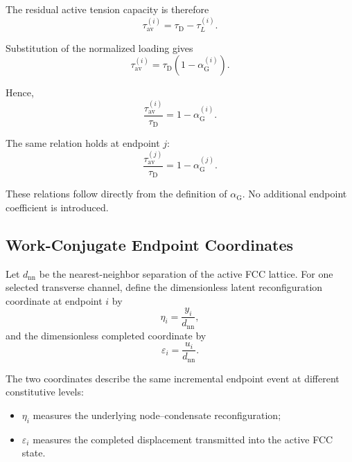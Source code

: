 The residual active tension capacity is therefore
\begin{equation}
    \tau_{\mathrm{av}}^{(i)} = \tau_{\mathrm{D}} - \tau_L^{(i)}.
\end{equation}

Substitution of the normalized loading gives
\begin{equation}
    \tau_{\mathrm{av}}^{(i)} = \tau_{\mathrm{D}} \left( 1-\alpha_{\mathrm{G}}^{(i)} \right).
\end{equation}

Hence,
\begin{equation}
    \boxed{ \frac{\tau_{\mathrm{av}}^{(i)}}{\tau_{\mathrm{D}}} = 1-\alpha_{\mathrm{G}}^{(i)} }.
\end{equation}

The same relation holds at endpoint $j$:
\begin{equation}
    \boxed{ \frac{\tau_{\mathrm{av}}^{(j)}}{\tau_{\mathrm{D}}} = 1-\alpha_{\mathrm{G}}^{(j)} }.
\end{equation}

These relations follow directly from the definition of $\alpha_{\mathrm{G}}$. No additional endpoint coefficient is introduced.

\subsection{Work-Conjugate Endpoint Coordinates}

Let $d_{\mathrm{nn}}$ be the nearest-neighbor separation of the active FCC lattice. For one selected transverse channel, define the dimensionless latent reconfiguration coordinate at endpoint $i$ by
\begin{equation}
    \eta_i = \frac{y_i}{d_{\mathrm{nn}}},
\end{equation}
and the dimensionless completed coordinate by
\begin{equation}
    \varepsilon_i = \frac{u_i}{d_{\mathrm{nn}}}.
\end{equation}

The two coordinates describe the same incremental endpoint event at different constitutive levels:
\begin{itemize}
    \item $\eta_i$ measures the underlying node--condensate reconfiguration;
    \item $\varepsilon_i$ measures the completed displacement transmitted into the active FCC state.
\end{itemize}


